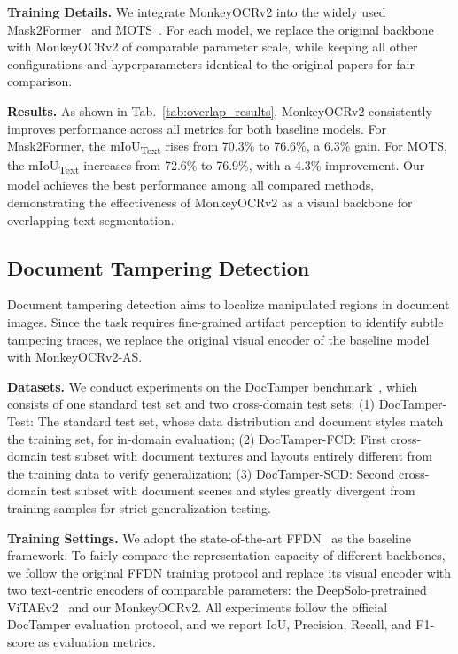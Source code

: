 \documentclass{article}
\begin{document}
    \textbf{Training Details.} 
    We integrate MonkeyOCRv2 into the widely used Mask2Former~\cite{mask2former} and MOTS~\cite{liu2025multi}.
    For each model, we replace the original backbone with MonkeyOCRv2 of comparable parameter scale, while keeping all other configurations and hyperparameters identical to the original papers for fair comparison.


    

    
    \textbf{Results.} As shown in Tab.~\ref{tab:overlap_results}, MonkeyOCRv2 consistently improves performance across all metrics for both baseline models. For 
    Mask2Former, the mIoU\textsubscript{Text} rises from 70.3\% to 76.6\%, a 6.3\% gain. 
    For MOTS,
    the mIoU\textsubscript{Text} increases from 72.6\% to 76.9\%, with a 4.3\% improvement. Our model achieves the best performance among all compared methods, demonstrating the effectiveness of MonkeyOCRv2 as a visual backbone for overlapping text segmentation.


\subsection{Document Tampering Detection}
    Document tampering detection aims to localize manipulated regions in document images. Since the task requires fine-grained artifact perception to identify subtle tampering traces, we replace the original visual encoder of the baseline model with MonkeyOCRv2-AS.

    \textbf{Datasets.} We conduct experiments on the DocTamper benchmark~\cite{qu2023towards}, which consists of one standard test set and two cross-domain test sets: (1) DocTamper-Test: 
    The standard test set, whose data distribution and document styles match the training set, for in-domain evaluation;
    (2) DocTamper-FCD: First cross-domain test subset with document textures and layouts 
    entirely different from the training data
    to verify generalization; (3) DocTamper-SCD: Second cross-domain test subset with document scenes and styles greatly divergent from training samples for strict generalization testing.
    
    \textbf{Training Settings.} We adopt the state-of-the-art FFDN~\cite{chen2024enhancing} as the baseline framework. To fairly compare the representation capacity of different backbones, we follow the original FFDN training protocol and replace its visual encoder with two text-centric encoders of comparable parameters: the DeepSolo-pretrained ViTAEv2~\cite{deepsolo} and our MonkeyOCRv2. All experiments follow the official DocTamper evaluation protocol, and we report IoU, Precision, Recall, and F1-score as evaluation metrics.
    
\end{document}
